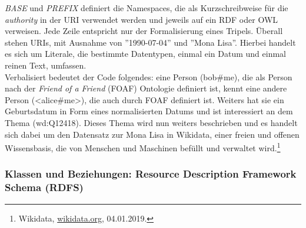 \documentclass[12pt,a4paper]{article}
\begin{document}
\textit{BASE} und \textit{PREFIX} definiert die Namespaces, die als Kurzschreibweise für die \textit{authority} in der URI verwendet werden und jeweils auf ein RDF oder OWL verweisen. Jede Zeile entspricht nur der Formalisierung eines Tripels. Überall stehen URIs, mit Ausnahme von ''1990-07-04'' und ''Mona Lisa''. Hierbei handelt es sich um Literale, die bestimmte Datentypen, einmal ein Datum und einmal reinen Text, umfassen. 
\\
Verbalisiert bedeutet der Code folgendes: eine Person (bob\#me), die als Person nach der \textit{Friend of a Friend} (FOAF) Ontologie definiert ist, kennt eine andere Person (<alice\#me>), die auch durch FOAF definiert ist. Weiters hat sie ein Geburtsdatum in Form eines normalisierten Datums und ist interessiert an dem Thema (wd:Q12418). Dieses Thema wird nun weiters beschrieben und es handelt sich dabei um den Datensatz zur Mona Lisa in Wikidata, einer freien und offenen Wissensbasis, die von Menschen und Maschinen befüllt und verwaltet wird.\footnote{Wikidata, \url{wikidata.org}, 04.01.2019.}
\subsubsection{Klassen und Beziehungen: Resource Description Framework Schema (RDFS)}
\end{document}
